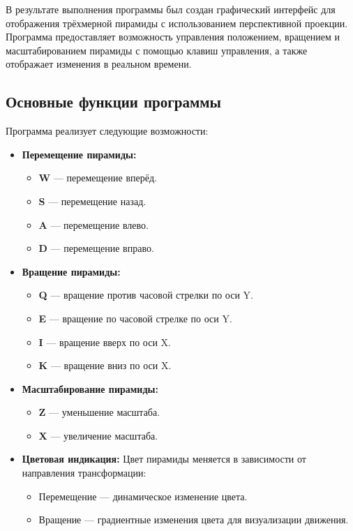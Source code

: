 В результате выполнения программы был создан графический интерфейс для отображения трёхмерной пирамиды с использованием перспективной проекции. Программа предоставляет возможность управления положением, вращением и масштабированием пирамиды с помощью клавиш управления, а также отображает изменения в реальном времени.

\subsection*{Основные функции программы}
Программа реализует следующие возможности:
\begin{itemize}
    \item \textbf{Перемещение пирамиды:}
    \begin{itemize}
        \item \textbf{W} — перемещение вперёд.
        \item \textbf{S} — перемещение назад.
        \item \textbf{A} — перемещение влево.
        \item \textbf{D} — перемещение вправо.
    \end{itemize}
    \item \textbf{Вращение пирамиды:}
    \begin{itemize}
        \item \textbf{Q} — вращение против часовой стрелки по оси Y.
        \item \textbf{E} — вращение по часовой стрелке по оси Y.
        \item \textbf{I} — вращение вверх по оси X.
        \item \textbf{K} — вращение вниз по оси X.
    \end{itemize}
    \item \textbf{Масштабирование пирамиды:}
    \begin{itemize}
        \item \textbf{Z} — уменьшение масштаба.
        \item \textbf{X} — увеличение масштаба.
    \end{itemize}
    \item \textbf{Цветовая индикация:} Цвет пирамиды меняется в зависимости от направления трансформации:
    \begin{itemize}
        \item Перемещение — динамическое изменение цвета.
        \item Вращение — градиентные изменения цвета для визуализации движения.
    \end{itemize}
\end{itemize}


